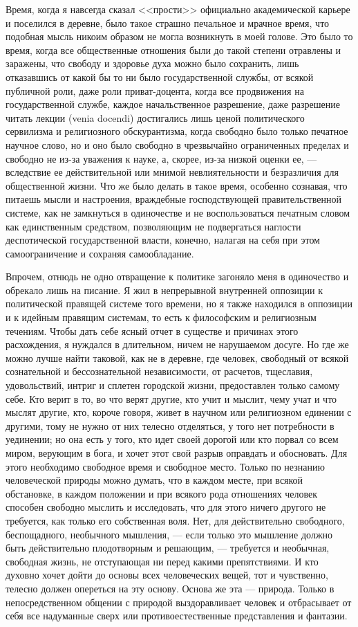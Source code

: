 \documentclass[12pt]{article}
\begin{document}
Время, когда я навсегда сказал <<прости>> официально академической карьере и поселился в деревне, было такое страшно печальное и мрачное время, что подобная мысль никоим образом не могла возникнуть в моей голове. Это было то время, когда все общественные отношения были до такой степени отравлены и заражены, что свободу и здоровье духа можно было сохранить, лишь отказавшись от какой бы то ни было государственной службы, от всякой публичной роли, даже роли приват-доцента, когда все продвижения на государственной службе, каждое начальственное разрешение, даже разрешение читать лекции (venia docendi) достигались лишь ценой политического сервилизма и религиозного обскурантизма, когда свободно было только печатное научное слово, но и оно было свободно в чрезвычайно ограниченных пределах и свободно не из-за уважения к науке, а, скорее, из-за низкой оценки ее, --- вследствие ее действительной или мнимой невлиятельности и безразличия для общественной жизни. Что же было делать в такое время, особенно сознавая, что питаешь мысли и настроения, враждебные господствующей правительственной системе, как не замкнуться в одиночестве и не воспользоваться печатным словом как единственным средством, позволяющим не подвергаться наглости деспотической государственной власти, конечно, налагая на себя при этом самоограничение и сохраняя самообладание. 

Впрочем, отнюдь не одно отвращение к политике загоняло меня в одиночество и обрекало лишь на писание. Я жил в непрерывной внутренней оппозиции к политической правящей системе того времени, но я также находился в оппозиции и к идейным правящим системам, то есть к философским и религиозным течениям. Чтобы дать себе ясный отчет в существе и причинах этого расхождения, я нуждался в длительном, ничем не нарушаемом досуге. Но где же можно лучше найти таковой, как не в деревне, где человек, свободный от всякой сознательной и бессознательной независимости, от расчетов, тщеславия, удовольствий, интриг и сплетен городской жизни, предоставлен только самому себе. Кто верит в то, во что верят другие, кто учит и мыслит, чему учат и что мыслят другие, кто, короче говоря, живет в научном или религиозном единении с другими, тому не нужно от них телесно отделяться, у того нет потребности в уединении; но она есть у того, кто идет своей дорогой или кто порвал со всем миром, верующим в бога, и хочет этот свой разрыв оправдать и обосновать. Для этого необходимо свободное время и свободное место. Только по незнанию человеческой природы можно думать, что в каждом месте, при всякой обстановке, в каждом положении и при всякого рода отношениях человек способен свободно мыслить и исследовать, что для этого ничего другого не требуется, как только его собственная воля. Нет, для действительно свободного, беспощадного, необычного мышления, --- если только это мышление должно быть действительно плодотворным и решающим, --- требуется и необычная, свободная жизнь, не отступающая ни перед какими препятствиями. И кто духовно хочет дойти до основы всех человеческих вещей, тот и чувственно, телесно должен опереться на эту основу. Основа же эта --- природа. Только в непосредственном общении с природой выздоравливает человек и отбрасывает от себя все надуманные сверх или противоестественные представления и фантазии. 
\end{document}
